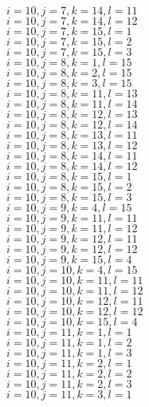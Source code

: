 \documentclass[14pt]{article}
\begin{document}
    $i=10,j=7,k=14,l=11 $ \\ 
    $i=10,j=7,k=14,l=12 $ \\ 
    $i=10,j=7,k=15,l=1 $ \\ 
    $i=10,j=7,k=15,l=2 $ \\ 
    $i=10,j=7,k=15,l=3 $ \\ 
    $i=10,j=8,k=1,l=15 $ \\ 
    $i=10,j=8,k=2,l=15 $ \\ 
    $i=10,j=8,k=3,l=15 $ \\ 
    $i=10,j=8,k=11,l=13 $ \\ 
    $i=10,j=8,k=11,l=14 $ \\ 
    $i=10,j=8,k=12,l=13 $ \\ 
    $i=10,j=8,k=12,l=14 $ \\ 
    $i=10,j=8,k=13,l=11 $ \\ 
    $i=10,j=8,k=13,l=12 $ \\ 
    $i=10,j=8,k=14,l=11 $ \\ 
    $i=10,j=8,k=14,l=12 $ \\ 
    $i=10,j=8,k=15,l=1 $ \\ 
    $i=10,j=8,k=15,l=2 $ \\ 
    $i=10,j=8,k=15,l=3 $ \\ 
    $i=10,j=9,k=4,l=15 $ \\ 
    $i=10,j=9,k=11,l=11 $ \\ 
    $i=10,j=9,k=11,l=12 $ \\ 
    $i=10,j=9,k=12,l=11 $ \\ 
    $i=10,j=9,k=12,l=12 $ \\ 
    $i=10,j=9,k=15,l=4 $ \\ 
    $i=10,j=10,k=4,l=15 $ \\ 
    $i=10,j=10,k=11,l=11 $ \\ 
    $i=10,j=10,k=11,l=12 $ \\ 
    $i=10,j=10,k=12,l=11 $ \\ 
    $i=10,j=10,k=12,l=12 $ \\ 
    $i=10,j=10,k=15,l=4 $ \\ 
    $i=10,j=11,k=1,l=1 $ \\ 
    $i=10,j=11,k=1,l=2 $ \\ 
    $i=10,j=11,k=1,l=3 $ \\ 
    $i=10,j=11,k=2,l=1 $ \\ 
    $i=10,j=11,k=2,l=2 $ \\ 
    $i=10,j=11,k=2,l=3 $ \\ 
    $i=10,j=11,k=3,l=1 $ \\ 
\end{document}
